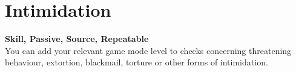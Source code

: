 \section{Intimidation}\label{sec:intimidation}
\textbf{Skill, Passive, Source, Repeatable}\\
You can add your relevant game mode level to checks concerning threatening behaviour, extortion, blackmail, torture or other forms of intimidation.